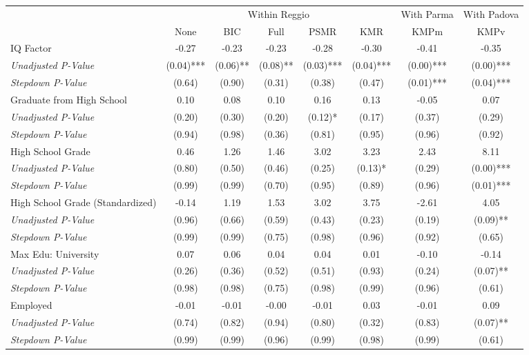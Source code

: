 \begin{tabular}{l c c c c c c c}
\toprule
& \multicolumn{5}{c}{Within Reggio} & With Parma & With Padova \\\cmidrule(lr){2-6} \cmidrule(lr){7-7} \cmidrule(lr){8-8}
 & None & BIC & Full & PSMR & KMR & KMPm & KMPv \\
\midrule
IQ Factor & -0.27 & -0.23 & -0.23 & -0.28 & -0.30 & -0.41 & -0.35 \\
\quad \textit{Unadjusted P-Value} & (0.04)*** & (0.06)** & (0.08)** & (0.03)*** & (0.04)*** & (0.00)*** & (0.00)*** \\
\quad \textit{Stepdown P-Value} & (0.64) & (0.90) & (0.31) & (0.38) & (0.47) & (0.01)*** & (0.04)*** \\
Graduate from High School & 0.10 & 0.08 & 0.10 & 0.16 & 0.13 & -0.05 & 0.07 \\
\quad \textit{Unadjusted P-Value} & (0.20) & (0.30) & (0.20) & (0.12)* & (0.17) & (0.37) & (0.29) \\
\quad \textit{Stepdown P-Value} & (0.94) & (0.98) & (0.36) & (0.81) & (0.95) & (0.96) & (0.92) \\
High School Grade & 0.46 & 1.26 & 1.46 & 3.02 & 3.23 & 2.43 & 8.11 \\
\quad \textit{Unadjusted P-Value} & (0.80) & (0.50) & (0.46) & (0.25) & (0.13)* & (0.29) & (0.00)*** \\
\quad \textit{Stepdown P-Value} & (0.99) & (0.99) & (0.70) & (0.95) & (0.89) & (0.96) & (0.01)*** \\
High School Grade (Standardized) & -0.14 & 1.19 & 1.53 & 3.02 & 3.75 & -2.61 & 4.05 \\
\quad \textit{Unadjusted P-Value} & (0.96) & (0.66) & (0.59) & (0.43) & (0.23) & (0.19) & (0.09)** \\
\quad \textit{Stepdown P-Value} & (0.99) & (0.99) & (0.75) & (0.98) & (0.96) & (0.92) & (0.65) \\
Max Edu: University & 0.07 & 0.06 & 0.04 & 0.04 & 0.01 & -0.10 & -0.14 \\
\quad \textit{Unadjusted P-Value} & (0.26) & (0.36) & (0.52) & (0.51) & (0.93) & (0.24) & (0.07)** \\
\quad \textit{Stepdown P-Value} & (0.98) & (0.98) & (0.75) & (0.98) & (0.99) & (0.96) & (0.61) \\
Employed & -0.01 & -0.01 & -0.00 & -0.01 & 0.03 & -0.01 & 0.09 \\
\quad \textit{Unadjusted P-Value} & (0.74) & (0.82) & (0.94) & (0.80) & (0.32) & (0.83) & (0.07)** \\
\quad \textit{Stepdown P-Value} & (0.99) & (0.99) & (0.96) & (0.99) & (0.98) & (0.99) & (0.61) \\

\end{tabular}
